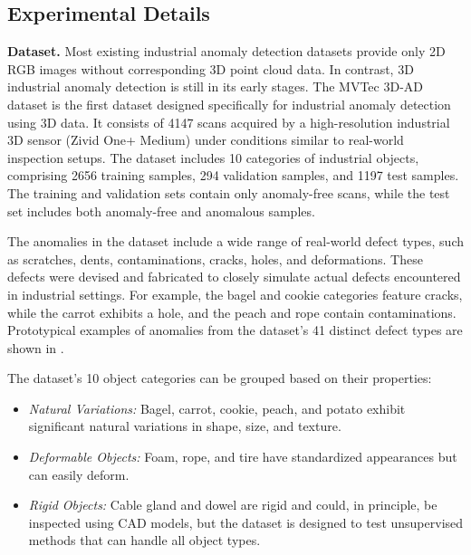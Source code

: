 \subsection*{Experimental Details}

\textbf{Dataset.}  Most existing industrial anomaly detection datasets provide only 2D RGB images without corresponding 3D point cloud data. In contrast, 3D industrial anomaly detection is still in its early stages. The MVTec 3D-AD dataset \cite{bergmann2022mvtec} is the first dataset designed specifically for industrial anomaly detection using 3D data. It consists of 4147 scans acquired by a high-resolution industrial 3D sensor (Zivid One+ Medium) under conditions similar to real-world inspection setups. The dataset includes 10 categories of industrial objects, comprising 2656 training samples, 294 validation samples, and 1197 test samples. The training and validation sets contain only anomaly-free scans, while the test set includes both anomaly-free and anomalous samples.  

The anomalies in the dataset include a wide range of real-world defect types, such as scratches, dents, contaminations, cracks, holes, and deformations. These defects were devised and fabricated to closely simulate actual defects encountered in industrial settings. For example, the bagel and cookie categories feature cracks, while the carrot exhibits a hole, and the peach and rope contain contaminations. Prototypical examples of anomalies from the dataset’s 41 distinct defect types are shown in \cite{bergmann2022mvtec}.  

The dataset's 10 object categories can be grouped based on their properties:
\begin{itemize}
    \item \textit{Natural Variations:} Bagel, carrot, cookie, peach, and potato exhibit significant natural variations in shape, size, and texture.
    \item \textit{Deformable Objects:} Foam, rope, and tire have standardized appearances but can easily deform.
    \item \textit{Rigid Objects:} Cable gland and dowel are rigid and could, in principle, be inspected using CAD models, but the dataset is designed to test unsupervised methods that can handle all object types.
\end{itemize}

